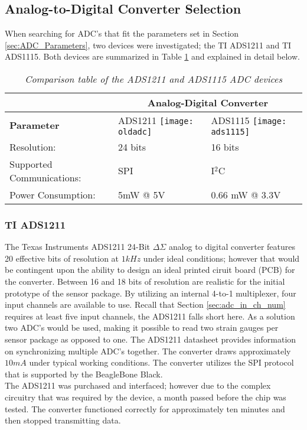 \subsection{Analog-to-Digital Converter Selection}
\indent When searching for ADC's that fit the parameters set in Section \ref{sec:ADC_Parameters}, two devices were investigated; the TI ADS1211 and TI
ADS1115. Both devices are summarized in Table \ref{tab:ADC_Compare} and explained in detail below.

\begin{table}[H]
\begin{center}
\begin{tabular}{|p{2.5cm}| p{3cm} | p{3cm} |}
\hline
&\multicolumn{2}{c|}{\textbf{Analog-Digital Converter}}\\
\hline
\textbf{Parameter} & ADS1211 
\texttt{[image: oldadc]}
& ADS1115
\texttt{[image: ads1115]}\\
\hline
Resolution: & 24 bits & 16 bits\\
\hline
Supported Communications:&	 SPI&I$^2$C\\
\hline
Power Consumption:&	5mW @ 5V	& 0.66 mW @ 3.3V\\
\hline

\end{tabular}
\caption{\textit{Comparison table of the ADS1211 and ADS1115 ADC devices}}
\label{tab:ADC_Compare}
\end{center}
\end{table}


\subsubsection{TI ADS1211}
\label{sec:ADC_ADS1211}
\indent The Texas Instruments ADS1211 24-Bit $\Delta \Sigma$ analog to digital converter features 20 effective bits of resolution at $1kHz$ under ideal
conditions; however that would be contingent upon the ability to design an ideal printed ciruit board (PCB) for the converter. Between 16 and 18 bits of
resolution are realistic for the initial prototype of the sensor package. By utilizing an internal 4-to-1 multiplexer, four input channels are available
to use. Recall that Section \ref{sec:adc_in_ch_num} requires at least five input channels, the ADS1211 falls short here. As a solution two ADC's would
be used, making it possible to read two strain gauges per sensor package as opposed to one. The ADS1211 datasheet provides information on synchronizing
multiple ADC's together. The converter draws approximately $10mA$ under typical working conditions. The converter utilizes the SPI protocol that is
supported by the BeagleBone Black.\\
\indent The ADS1211 was purchased and interfaced; however due to the complex circuitry that was required by the device, a month passed before the chip was
tested. The converter functioned correctly for approximately ten minutes and then stopped transmitting data. 
